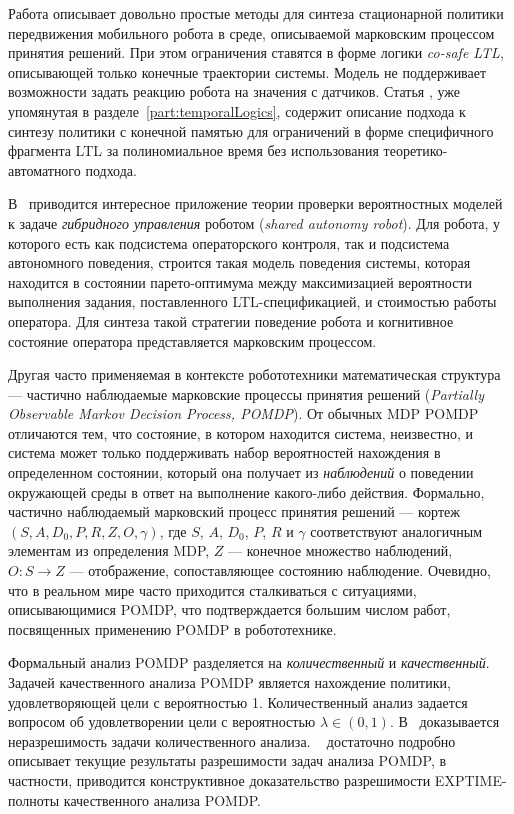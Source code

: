 \documentclass[a4, 14pt]{article}
\begin{document}
Работа \cite{lacerda2014optimal} описывает довольно простые методы для синтеза стационарной политики 
передвижения мобильного робота в среде, описываемой марковским процессом принятия решений. 
При этом ограничения ставятся в форме логики \textit{co-safe LTL}, описывающей только конечные 
траектории системы. Модель не поддерживает возможности задать реакцию робота на значения с датчиков.
Статья \cite{wolff2013efficient}, уже упомянутая в разделе~\ref{part:temporalLogics}, содержит описание
подхода к синтезу политики с конечной памятью для ограничений в форме специфичного фрагмента LTL за 
полиномиальное время без использования теоретико-автоматного подхода.

В~\cite{fu2014pareto} приводится интересное приложение теории проверки вероятностных моделей 
к задаче \textit{гибридного управления} роботом (\textit{shared autonomy robot}). Для 
робота, у которого есть как подсистема операторского контроля, так и подсистема 
автономного поведения, строится такая модель поведения системы, которая находится 
в состоянии парето-оптимума между максимизацией вероятности выполнения задания, 
поставленного LTL-спецификацией, и стоимостью работы оператора. Для синтеза 
такой стратегии поведение робота и когнитивное состояние оператора представляется 
марковским процессом.

Другая часто применяемая в контексте робототехники математическая структура --- 
частично наблюдаемые марковские процессы принятия решений 
(\textit{Partially Observable Markov Decision Process, POMDP}). От обычных MDP POMDP 
отличаются тем, что состояние, в котором находится система, неизвестно, и система 
может только поддерживать набор вероятностей нахождения в определенном состоянии, 
который она получает из \textit{наблюдений} о поведении окружающей среды в ответ на 
выполнение какого-либо действия. Формально, частично наблюдаемый марковский 
процесс принятия решений --- кортеж $(S, A, D_0, P, R, Z, O, \gamma)$, 
где $S$, $A$, $D_0$, $P$, $R$ и $\gamma$ соответствуют аналогичным элементам 
из определения MDP, $Z$ --- конечное множество наблюдений, $O: S\rightarrow{}Z$ 
--- отображение, сопоставляющее состоянию наблюдение. Очевидно, что в реальном 
мире часто приходится сталкиваться с ситуациями, описывающимися POMDP, что 
подтверждается большим числом работ, посвященных применению POMDP в робототехнике.

Формальный анализ POMDP разделяется на \textit{количественный} и \textit{качественный}. 
Задачей качественного анализа POMDP является нахождение политики, удовлетворяющей 
цели с вероятностью 1. Количественный анализ задается вопросом об удовлетворении 
цели с вероятностью $\lambda \in (0,1)$. В~\cite{baier2012probabilistic} доказывается 
неразрешимость задачи количественного анализа. ~\cite{chatterjee2013decidable} достаточно
подробно описывает текущие результаты разрешимости задач анализа POMDP, в частности,
приводится конструктивное доказательство разрешимости EXPTIME-полноты качественного 
анализа POMDP. 
\end{document}
